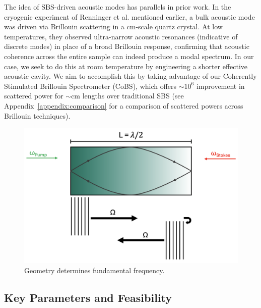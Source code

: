 The idea of \ac{SBS}-driven acoustic modes has parallels in prior work. In the cryogenic experiment of Renninger et al. mentioned earlier, \cite{renninger2018bulk} a bulk acoustic mode was driven via Brillouin scattering in a \si{\centi\meter}-scale quartz crystal. At low temperatures, they observed ultra-narrow acoustic resonances (indicative of discrete modes) in place of a broad Brillouin response, confirming that acoustic coherence across the entire sample can indeed produce a modal spectrum. In our case, we seek to do this at room temperature by engineering a shorter effective acoustic cavity. We aim to accomplish this by taking advantage of our Coherently Stimulated Brillouin Spectrometer (\ac{CoBS}), which offers \(\sim 10^6\) improvement in scattered power for \(\sim\)\si{\centi\meter} lengths over traditional \ac{SBS} (see Appendix~\ref{appendix:comparison} for a comparison of scattered powers across Brillouin techniques).

\begin{figure}[t]
  \centering
  \includegraphics[width=.85\textwidth]{figs/4-Raman/GeometryDeterminesFundamentalFreq.png}
  \caption{Geometry determines fundamental frequency.}
  \label{fig:Raman:GeometryDeterminesFundamentalFreq}
\end{figure}

\subsection{Key Parameters and Feasibility}
\label{subsec:Raman:KeyParametersandFeasibility}

